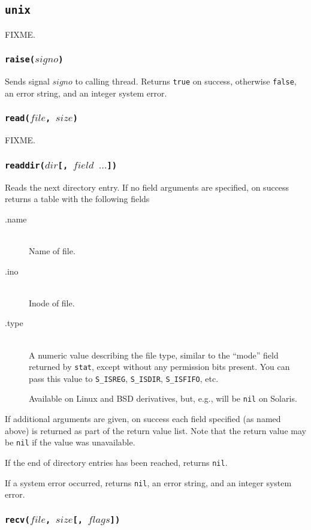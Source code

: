 \documentclass[11pt, oneside]{memoir}
\newcommand*{\true}[0]{\texttt{true}\xspace}
\newcommand*{\false}[0]{\texttt{false}\xspace}
\newcommand*{\nil}[0]{\texttt{nil}\xspace}
\newcommand*{\syscall}[1]{\texttt{#1}\xspace}
\newcommand*{\fn}[1]{\texttt{#1}\xspace}
\newcounter{toccols}
\newenvironment{Module}[1]{
	\subsection{\texttt{#1}}
	\addtocontents{toc}{
		\protect\begin{multicols}{\value{toccols}}
	}
}{
	\addtocontents{toc}{\protect\end{multicols}}
}
\begin{document}
\begin{Module}{unix}
FIXME.

\subsubsection[\fn{raise}]{\fn{raise($signo$)}}

Sends signal $signo$ to calling thread. Returns \true on success, otherwise \false, an error string, and an integer system error.

\subsubsection[\fn{read}]{\fn{read($file$, $size$)}}

FIXME.

\subsubsection[\fn{readdir}]{\fn{readdir($dir$[, $field$ $\ldots$])}}

Reads the next directory entry. If no field arguments are specified, on success returns a table with the following fields

\begin{description}
\item[.name] \hfill \\
Name of file.
\item[.ino] \hfill \\
Inode of file.
\item[.type] \hfill \\
A numeric value describing the file type, similar to the ``mode'' field returned by \syscall{stat}, except without any permission bits present. You can pass this value to \fn{S\_ISREG}, \fn{S\_ISDIR}, \fn{S\_ISFIFO}, etc.

Available on Linux and BSD derivatives, but, e.g., will be \nil on Solaris.
\end{description}

If additional arguments are given, on success each field specified (as named above) is returned as part of the return value list. Note that the return value may be \nil if the value was unavailable.

If the end of directory entries has been reached, returns \nil.

If a system error occurred, returns \nil, an error string, and an integer system error.

\subsubsection[\fn{recv}]{\fn{recv($file$, $size$[, $flags$])}}


\end{Module}
\end{document}
